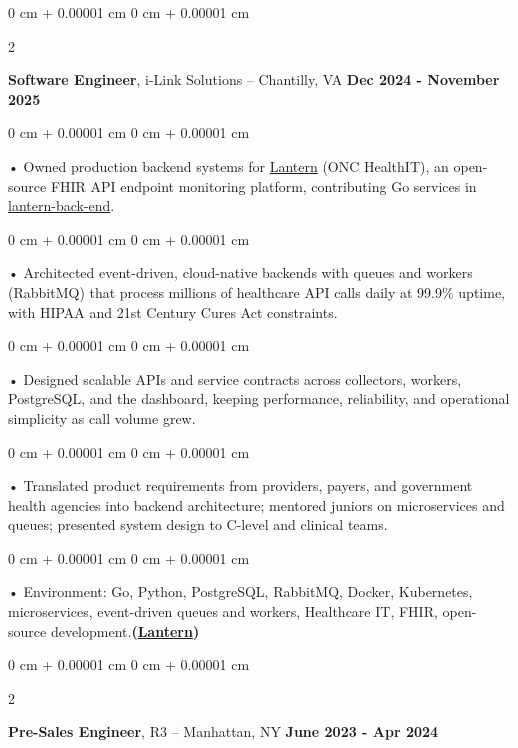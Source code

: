 \documentclass[10pt, letterpaper]{article}
\newenvironment{onecolentry}{
    \begin{adjustwidth}{
        0 cm + 0.00001 cm
    }{
        0 cm + 0.00001 cm
    }
}{
    \end{adjustwidth}
} %
\newenvironment{twocolentry}[2][]{
    \onecolentry
    \def\secondColumn{#2}
    \setcolumnwidth{\fill, 4.5 cm}
    \begin{paracol}{2}
}{
    \switchcolumn \raggedleft \secondColumn
    \end{paracol}
    \endonecolentry
} %
\begin{document}
        \begin{twocolentry}{
            \textbf{Dec 2024 - November 2025}
        }
            \textbf{Software Engineer}, i-Link Solutions -- Chantilly, VA\end{twocolentry}


        \begin{onecolentry}
             • Owned production backend systems for \href{https://lantern.healthit.gov/?tab=dashboard_tab}{Lantern} (ONC HealthIT), an open-source FHIR API endpoint monitoring platform, contributing Go services in \href{https://github.com/onc-healthit/lantern-back-end}{lantern-back-end}.
        \end{onecolentry}
        \begin{onecolentry}
             • Architected event-driven, cloud-native backends with queues and workers (RabbitMQ) that process millions of healthcare API calls daily at 99.9\% uptime, with HIPAA and 21st Century Cures Act constraints.
        \end{onecolentry}
        \begin{onecolentry}
             • Designed scalable APIs and service contracts across collectors, workers, PostgreSQL, and the dashboard, keeping performance, reliability, and operational simplicity as call volume grew.
        \end{onecolentry}
        \begin{onecolentry}
             • Translated product requirements from providers, payers, and government health agencies into backend architecture; mentored juniors on microservices and queues; presented system design to C-level and clinical teams.
        \end{onecolentry}

        \begin{onecolentry}
             • Environment: Go, Python, PostgreSQL, RabbitMQ, Docker, Kubernetes, microservices, event-driven queues and workers, Healthcare IT, FHIR, open-source development.\textbf{(\href{https://lantern.healthit.gov/?tab=dashboard_tab}{Lantern})}
        \end{onecolentry}
        \vspace{0.1cm}

        \begin{twocolentry}{
            \textbf{June 2023 - Apr 2024}
        }
            \textbf{Pre-Sales Engineer}, R3 -- Manhattan, NY\end{twocolentry}
\end{document}
